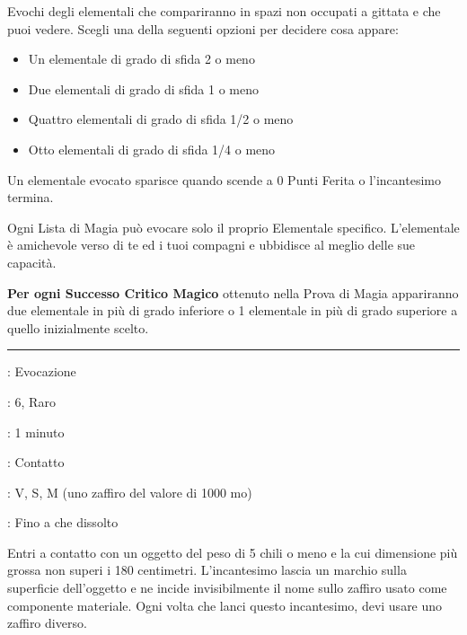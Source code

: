 \begin{multicols}{2}
Evochi degli elementali che compariranno in spazi non occupati a gittata e che puoi vedere. Scegli una della seguenti opzioni per decidere cosa appare:

\begin{itemize}[leftmargin=*] \setlength{\itemsep}{-1pt}
	\item Un elementale di grado di sfida 2 o meno
	\item Due elementali di grado di sfida 1 o meno
	\item Quattro elementali di grado di sfida 1/2 o meno
	\item Otto elementali di grado di sfida 1/4 o meno
\end{itemize}

Un elementale evocato sparisce quando scende a 0 Punti Ferita o l'incantesimo termina.

Ogni Lista di Magia può evocare solo il proprio Elementale specifico. L'elementale è amichevole verso di te ed i tuoi compagni e ubbidisce al meglio delle sue capacità.

\textbf{Per ogni Successo Critico Magico} ottenuto nella Prova di Magia appariranno due elementale in più di grado inferiore o 1 elementale in più di grado superiore a quello inizialmente scelto.

\smallskip\noindent\rule{\linewidth}{2pt} \hypertarget{Evocazioni Istantanee}{}\medskip{}
\noindent
\begin{description}[noitemsep, topsep=0pt, parsep=0pt, partopsep=0pt, leftmargin=0cm, labelwidth=2.8cm]
	\item[\textbf{Lista di Magia}]: Evocazione
	\item[\textbf{Livello}]: 6, Raro
	\item[\textbf{T. di Lancio}]: 1 minuto
	\item[\textbf{Gittata}]: Contatto
	\item[\textbf{Componenti}]: V, S, M (uno zaffiro del valore di 1000 mo)
	\item[\textbf{Durata}]: Fino a che dissolto
\end{description}

Entri a contatto con un oggetto del peso di 5 chili o meno e la cui dimensione più grossa non superi i 180 centimetri. L'incantesimo lascia un marchio sulla superficie dell'oggetto e ne incide invisibilmente il nome sullo zaffiro usato come componente materiale. Ogni volta che lanci questo incantesimo, devi usare uno zaffiro diverso.


\end{multicols}
